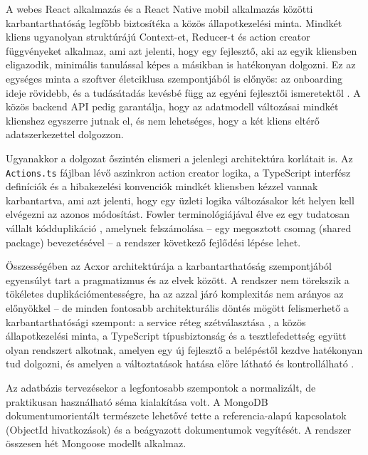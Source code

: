 
A webes React alkalmazás és a React Native mobil alkalmazás közötti karbantarthatóság legfőbb biztosítéka a közös állapotkezelési minta. Mindkét kliens ugyanolyan struktúrájú Context-et, Reducer-t és action creator függvényeket alkalmaz, ami azt jelenti, hogy egy fejlesztő, aki az egyik kliensben eligazodik, minimális tanulással képes a másikban is hatékonyan dolgozni. Ez az egységes minta a szoftver életciklusa szempontjából is előnyös: az onboarding ideje rövidebb, és a tudásátadás kevésbé függ az egyéni fejlesztői ismeretektől \cite{martin2008clean}. A közös backend API pedig garantálja, hogy az adatmodell változásai mindkét klienshez egyszerre jutnak el, és nem lehetséges, hogy a két kliens eltérő adatszerkezettel dolgozzon.

Ugyanakkor a dolgozat őszintén elismeri a jelenlegi architektúra korlátait is. Az \texttt{Actions.ts} fájlban lévő aszinkron action creator logika, a TypeScript interfész definíciók és a hibakezelési konvenciók mindkét kliensben kézzel vannak karbantartva, ami azt jelenti, hogy egy üzleti logika változásakor két helyen kell elvégezni az azonos módosítást. Fowler terminológiájával élve ez egy tudatosan vállalt kódduplikáció \cite{fowler2018refactoring}, amelynek felszámolása -- egy megosztott csomag (shared package) bevezetésével -- a rendszer következő fejlődési lépése lehet.


Összességében az Acxor architektúrája a karbantarthatóság szempontjából egyensúlyt tart a pragmatizmus és az elvek között. A rendszer nem törekszik a tökéletes duplikáció\-mentességre, ha az azzal járó komplexitás nem arányos az előnyökkel -- de minden fontosabb architekturális döntés mögött felismerhető a karbantarthatósági szempont: a service réteg szétválasztása \cite{gamma1994design}, a közös állapotkezelési minta, a TypeScript típusbiztonság \cite{typescript} és a tesztlefedettség együtt olyan rendszert alkotnak, amelyen egy új fejlesztő a belépéstől kezdve hatékonyan tud dolgozni, és amelyen a változtatások hatása előre látható és kontrollálható \cite{martin2008clean}.


Az adatbázis tervezésekor a legfontosabb szempontok a normalizált, de praktikusan használható séma kialakítása volt. A MongoDB dokumentumorientált természete lehetővé tette a referencia-alapú kapcsolatok (ObjectId hivatkozások) és a beágyazott dokumentumok vegyítését. A rendszer összesen hét Mongoose modellt alkalmaz.

